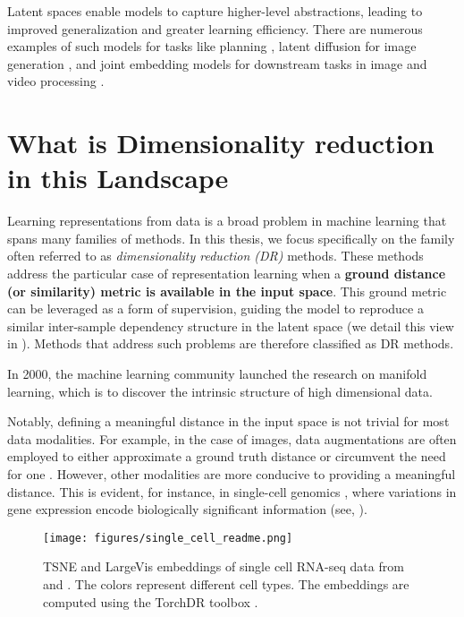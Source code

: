 Latent spaces enable models to capture higher-level abstractions, leading to improved generalization and greater learning efficiency. There are numerous examples of such models for tasks like planning \citep{hafner2019dream}, latent diffusion for image generation \citep{rombach2022high}, and joint embedding models for downstream tasks in image and video processing \citep{assran2023self, bardes2023v}.


\section{What is Dimensionality reduction in this Landscape}

Learning representations from data is a broad problem in machine learning that spans many families of methods. In this thesis, we focus specifically on the family often referred to as \emph{dimensionality reduction (DR)} methods. These methods address the particular case of representation learning when a \textbf{ground distance (or similarity) metric is available in the input space}. This ground metric can be leveraged as a form of supervision, guiding the model to reproduce a similar inter-sample dependency structure in the latent space (we detail this view in ). Methods that address such problems are therefore classified as DR methods.

In 2000, the machine learning community launched the research on manifold learning, which is to discover the
intrinsic structure of high dimensional data. 

Notably, defining a meaningful distance in the input space is not trivial for most data modalities. For example, in the case of images, data augmentations are often employed to either approximate a ground truth distance or circumvent the need for one \citep{chen2020simple}. However, other modalities are more conducive to providing a meaningful distance. This is evident, for instance, in single-cell genomics \citep{amir2013visne}, where variations in gene expression encode biologically significant information (see, \eg {}).


\begin{figure}[t]
    \centering
    \texttt{[image: figures/single\_cell\_readme.png]}
    \caption{TSNE and LargeVis embeddings of single cell RNA-seq data from \citep{macosko2015highly} and \citep{zheng2017massively}. The colors represent different cell types. The embeddings are computed using the TorchDR toolbox \citep{vanassel2024torchdr}.
    }
    \label{fig:intro_fig}
\end{figure}




